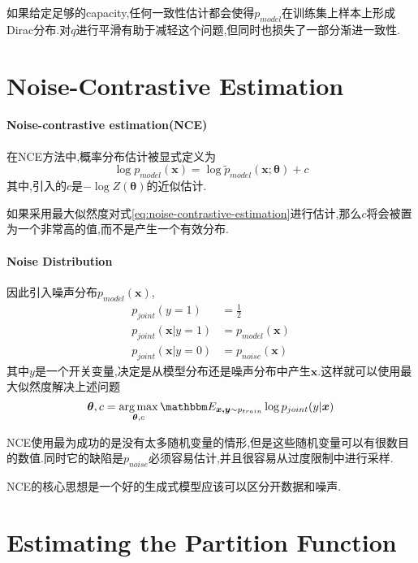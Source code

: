 如果给定足够的capacity,任何一致性估计都会使得$p_{model}$在训练集上样本上形成Dirac分布.对$q$进行平滑有助于减轻这个问题,但同时也损失了一部分渐进一致性.

\section{Noise-Contrastive Estimation}

\paragraph{Noise-contrastive estimation(NCE)}在NCE方法中,概率分布估计被显式定义为
\begin{equation}\label{eq:noise-contrastive-estimation}
\log p_{model}(\bm x)=\log\tilde p_{model}(\bm x;\bm\theta)+c
\end{equation}
其中,引入的$c$是$-\log Z(\bm\theta)$的近似估计.

如果采用最大似然度对式\ref{eq:noise-contrastive-estimation}进行估计,那么$c$将会被置为一个非常高的值,而不是产生一个有效分布.

\paragraph{Noise Distribution}因此引入噪声分布$p_{model}(\bm x)$,
\begin{equation}\begin{split}
p_{joint}(y=1)&=\frac{1}{2}\\
p_{joint}(\bm x|y=1)&=p_{model}(\bm x)\\
p_{joint}(\bm x|y=0)&=p_{noise}(\bm x)
\end{split}\end{equation}
其中$y$是一个开关变量,决定是从模型分布还是噪声分布中产生$\bm x$.这样就可以使用最大似然度解决上述问题
\begin{equation}
\bm\theta,c=\mathop{\arg\max}_{\bm\theta,c}\mathbbm E_{\bm{x,y}\sim p_{train}}\log p_{joint}(y|\bm x)
\end{equation}

NCE使用最为成功的是没有太多随机变量的情形,但是这些随机变量可以有很数目的数值.同时它的缺陷是$p_{noise}$必须容易估计,并且很容易从过度限制中进行采样.

NCE的核心思想是一个好的生成式模型应该可以区分开数据和噪声.

\section{Estimating the Partition Function}

